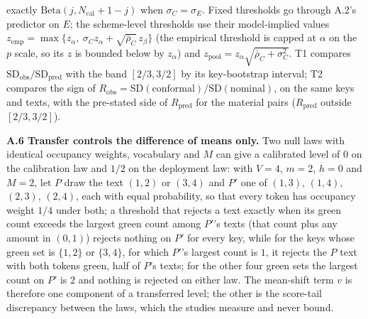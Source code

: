 \documentclass[11pt,letterpaper]{article}
\begin{document}
exactly \(\mathrm{Beta}(j, N_{\mathrm{cal}} + 1 - j)\) when \(\sigma_C = \sigma_E\). Fixed thresholds go through A.2's predictor on \(E\); the scheme-level thresholds use their model-implied values \(z_{\mathrm{emp}} = \max\{z_\alpha,\ \sigma_C z_\alpha + \sqrt{\bar\rho_C}\, z_\beta\}\) (the empirical threshold is capped at \(\alpha\) on the \(p\) scale, so its \(z\) is bounded below by \(z_\alpha\)) and \(z_{\mathrm{pool}} = z_\alpha\sqrt{\bar\rho_C + \sigma_C^2}\). T1 compares \(\mathrm{SD}_{\mathrm{obs}}/\mathrm{SD}_{\mathrm{pred}}\) with the band \([2/3, 3/2]\) by its key-bootstrap interval; T2 compares the sign of \(R_{\mathrm{obs}} = \mathrm{SD}(\mathrm{conformal})/\mathrm{SD}(\mathrm{nominal})\), on the same keys and texts, with the pre-stated side of \(R_{\mathrm{pred}}\) for the material pairs (\(R_{\mathrm{pred}}\) outside \([2/3, 3/2]\)).

\textbf{A.6 Transfer controls the difference of means only.} Two null laws with identical occupancy weights, vocabulary and \(M\) can give a calibrated level of \(0\) on the calibration law and \(1/2\) on the deployment law: with \(V = 4\), \(m = 2\), \(h = 0\) and \(M = 2\), let \(P\) draw the text \((1, 2)\) or \((3, 4)\) and \(P'\) one of \((1, 3)\), \((1, 4)\), \((2, 3)\), \((2, 4)\), each with equal probability, so that every token has occupancy weight \(1/4\) under both; a threshold that rejects a text exactly when its green count exceeds the largest green count among \(P'\)'s texts (that count plus any amount in \((0, 1)\)) rejects nothing on \(P'\) for every key, while for the keys whose green set is \(\{1, 2\}\) or \(\{3, 4\}\), for which \(P'\)'s largest count is \(1\), it rejects the \(P\) text with both tokens green, half of \(P\)'s texts; for the other four green sets the largest count on \(P'\) is \(2\) and nothing is rejected on either law. The mean-shift term \(v\) is therefore one component of a transferred level; the other is the score-tail discrepancy between the laws, which the studies measure and never bound.
\end{document}
